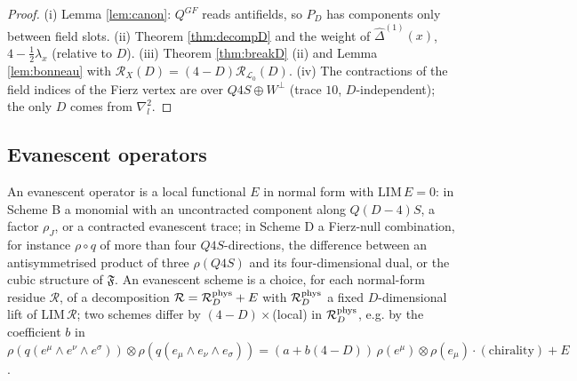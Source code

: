 \begin{proof}
(i) Lemma \ref{lem:canon}: $Q^{GF}$ reads antifields, so $P_D$ has components only between field slots. (ii) Theorem \ref{thm:decompD} and the weight of $\widehat\Delta^{(1)}(x)$, $4-\frac12\lambda_x$ (relative to $D$). (iii) Theorem \ref{thm:breakD} (ii) and Lemma \ref{lem:bonneau} with $\mathcal R_X(D)=(4-D)\mathcal R_{\mathscr L_0}(D)$. (iv) The contractions of the field indices of the Fierz vertex are over $Q4S\oplus W^\perp$ (trace $10$, $D$-independent); the only $D$ comes from $\nabla^2_l$.
\end{proof}

\subsection{Evanescent operators}

\begin{definition}
\label{def:evop}
An evanescent operator is a local functional $E$ in normal form with $\mathrm{LIM}\,E=0$: in Scheme B a monomial with an uncontracted component along $Q(D{-}4)S$, a factor $\rho_J$, or a contracted evanescent trace; in Scheme D a Fierz-null combination, for instance $\rho\circ q$ of more than four $Q4S$-directions, the difference between an antisymmetrised product of three $\rho(Q4S)$ and its four-dimensional dual, or the cubic structure of $\mathfrak F$. An evanescent scheme is a choice, for each normal-form residue $\mathcal R$, of a decomposition $\mathcal R=\mathcal R^{\rm phys}_D+E$ with $\mathcal R^{\rm phys}_D$ a fixed $D$-dimensional lift of $\mathrm{LIM}\,\mathcal R$; two schemes differ by $(4-D)\times$(local) in $\mathcal R^{\rm phys}_D$, e.g. by the coefficient $b$ in $\rho(q(e^\mu\wedge e^\nu\wedge e^\sigma))\otimes\rho(q(e_\mu\wedge e_\nu\wedge e_\sigma))=(a+b(4-D))\,\rho(e^\mu)\otimes\rho(e_\mu)\cdot(\text{chirality})+E$.
\end{definition}

